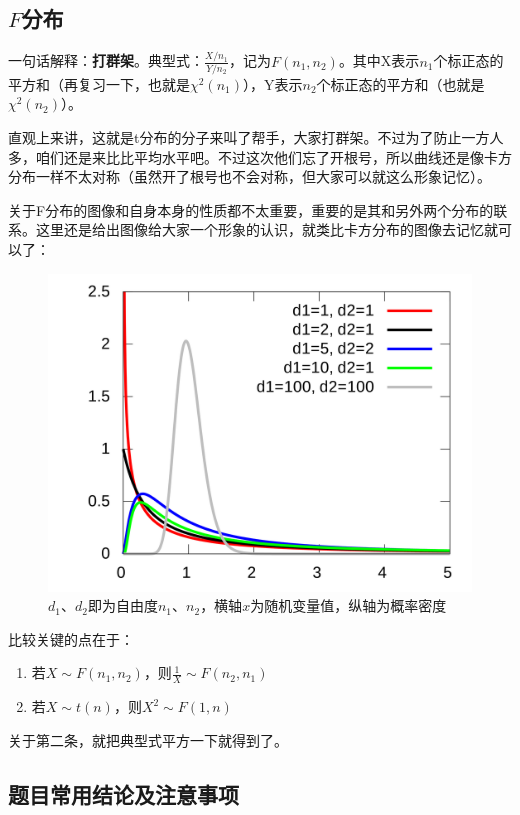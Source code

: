 \documentclass[10pt, a4paper]{article}
\begin{document}
\subsection{$F$分布}
一句话解释：\textbf{打群架}。典型式：$\frac{X/n_1}{Y/n_2}$，记为$F(n_1,n_2)$。其中X表示$n_1$个标正态的平方和（再复习一下，也就是$\chi^{2}(n_1)$），Y表示$n_2$个标正态的平方和（也就是$\chi^{2}(n_2)$）。\par
直观上来讲，这就是t分布的分子来叫了帮手，大家打群架。不过为了防止一方人多，咱们还是来比比平均水平吧。不过这次他们忘了开根号，所以曲线还是像卡方分布一样不太对称（虽然开了根号也不会对称，但大家可以就这么形象记忆）。\par
关于F分布的图像和自身本身的性质都不太重要，重要的是其和另外两个分布的联系。这里还是给出图像给大家一个形象的认识，就类比卡方分布的图像去记忆就可以了：
\begin{figure}[H]
    \centering
    \includegraphics[width=0.5\linewidth]{F.png}
    \caption{$d_1$、$d_2$即为自由度$n_1$、$n_2$，横轴$x$为随机变量值，纵轴为概率密度}
    \label{fig:F}
\end{figure}
比较关键的点在于：
\begin{enumerate}
    \item 若$X\sim F(n_1,n_2)$，则$\frac{1}{X}\sim F(n_2,n_1)$
    \item 若$X\sim t(n)$，则$X^2\sim F(1,n)$
\end{enumerate}\par
关于第二条，就把典型式平方一下就得到了。

\subsection{题目常用结论及注意事项}
\end{document}
